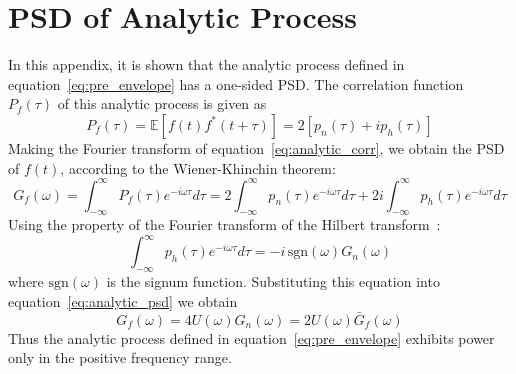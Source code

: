 \documentclass[12pt]{article}
\begin{document}
\section{PSD of Analytic Process}
In this appendix, it is shown that the analytic process defined in equation~\eqref{eq:pre_envelope} has a one-sided PSD. The correlation function $P_f(\tau)$ of this analytic process is given as
\begin{equation}
    P_f(\tau) = \mathbb{E}[f(t) f^*(t+\tau)] = 2 [p_n(\tau) + i p_h(\tau)]
    \label{eq:analytic_corr}
\end{equation}
Making the Fourier transform of equation~\eqref{eq:analytic_corr}, we obtain the PSD of $f(t)$, according to the Wiener-Khinchin theorem:
\begin{equation}
    G_f(\omega) = \int_{-\infty}^{\infty} P_f(\tau) e^{-i\omega \tau} d\tau = 2 \int_{-\infty}^{\infty} p_n(\tau) e^{-i\omega \tau} d\tau + 2i \int_{-\infty}^{\infty} p_h(\tau) e^{-i\omega \tau} d\tau
    \label{eq:analytic_psd}
\end{equation}
Using the property of the Fourier transform of the Hilbert transform~\cite{papoulis1984}:
\begin{equation}
    \int_{-\infty}^{\infty} p_h(\tau) e^{-i\omega \tau} d\tau = -i\, \text{sgn}(\omega) G_n(\omega)
    \label{eq:hilbert_fourier}
\end{equation}
where $\text{sgn}(\omega)$ is the signum function. Substituting this equation into equation~\eqref{eq:analytic_psd} we obtain
\begin{equation}
    G_f(\omega) = 4 U(\omega) G_n(\omega) = 2 U(\omega) \bar{G}_f(\omega)
    \label{eq:analytic_psd_final}
\end{equation}
Thus the analytic process defined in equation~\eqref{eq:pre_envelope} exhibits power only in the positive frequency range.
\end{document}
